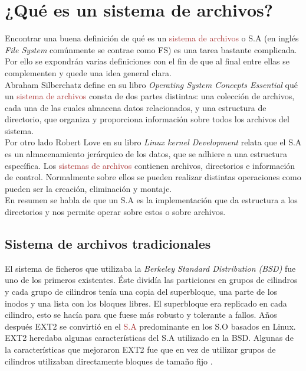 \section{¿Qué es un sistema de archivos?}
Encontrar una buena definición de qué es un \textcolor{brown}{sistema de archivos} o S.A (en inglés \textit{File System} comúnmente se contrae como FS) es una tarea bastante complicada. Por ello se expondrán varias definiciones con el fin de que al final entre ellas se complementen y quede una idea general clara. \\

Abraham Silberchatz define en su libro \textit{Operating System Concepts Essential} \cite{silberchatz} qué un \textcolor{brown}{sistema de archivos} consta de dos partes distintas: una colección de archivos, cada una de las cuales almacena datos relacionados, y una estructura de directorio, que organiza y proporciona información sobre todos los archivos del sistema.\\

Por otro lado Robert Love en su libro \textit{Linux kernel Development} \cite{LinuxKernelDev} relata que el S.A es un almacenamiento jerárquico de los datos, que se adhiere a una estructura específica. Los \textcolor{brown}{sistemas de archivos} contienen archivos, directorios e información de control. Normalmente sobre ellos se pueden realizar distintas operaciones como pueden ser la creación, eliminación y montaje.\\

En resumen se habla de que un S.A es la implementación que da estructura a los directorios y nos permite operar sobre estos o sobre archivos.

\subsection{Sistema de archivos tradicionales}

El sistema de ficheros que utilizaba la \textit{Berkeley Standard Distribution (BSD)} fue uno de los primeros existentes. Éste dividía las particiones en grupos de cilindros y cada grupo de cilindros tenía una copia del superbloque, una parte de los inodos y una lista con los bloques libres. El superbloque era replicado en cada cilindro, esto se hacía para que fuese más robusto y tolerante a fallos. Años después EXT2 se convirtió en el \textcolor{brown}{S.A} predominante en los S.O basados en Linux. EXT2 heredaba algunas características del S.A utilizado en la BSD. Algunas de la características que mejoraron EXT2 fue que en vez de utilizar grupos de cilindros utilizaban directamente bloques de tamaño fijo \cite{LinuxKernelDev}.


